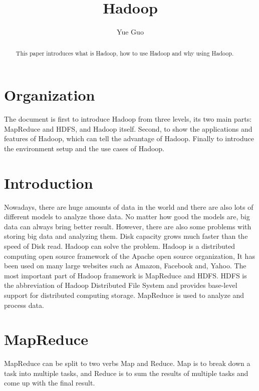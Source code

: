 
\title{Hadoop}



\author{Yue Guo}

\begin{abstract}
This paper introduces what is Hadoop, how to use Hadoop and why using Hadoop.
\end{abstract}


\maketitle

\section{Organization}
The document is first to introduce Hadoop from three levels, its two main parts: 
MapReduce and HDFS, and Hadoop itself. Second, to show the applications and 
 features of Hadoop, which can tell the advantage of Hadoop. Finally 
 to introduce the environment setup and the use cases of Hadoop.

\section{Introduction}
Nowadays, there are huge amounts of data in the world and there are also lots of
 different models to analyze those data. No matter how good the models are, big 
 data can always bring better result. However, there are also some problems with
  storing big data and analyzing them. Disk capacity grows much faster than the 
  speed of Disk read. Hadoop can solve the problem. Hadoop is a distributed 
  computing open source framework of the Apache open source organization, It has 
  been used on many large websites such as Amazon, Facebook and, Yahoo. The most 
  important part of Hadoop framework is MapReduce and HDFS. HDFS is the abbreviation 
  of Hadoop Distributed File System and provides base-level support for distributed 
  computing storage. MapReduce is used to analyze and process data.

\section{MapReduce}
MapReduce can be split to two verbs Map and Reduce. Map is to break down a task 
into multiple tasks, and Reduce is to sum the results of multiple tasks and come up 
with the final result. 

